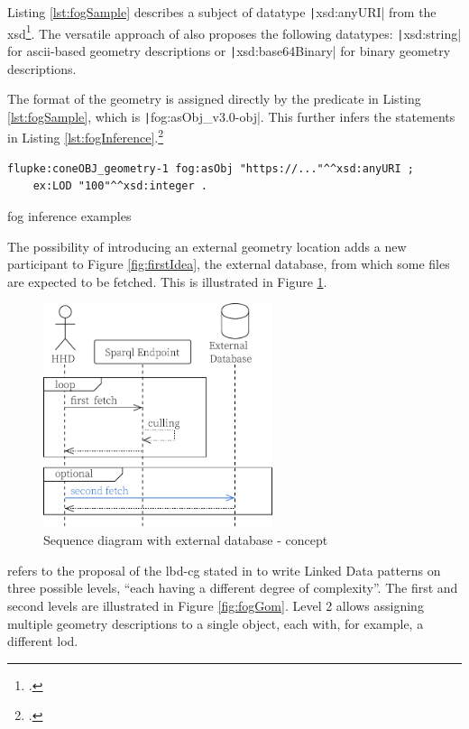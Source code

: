Listing \ref{lst:fogSample} describes a subject of datatype \texttt|xsd:anyURI| from the \ac{xsd}\footcites{xsd}. The versatile approach of \cite{Bonduel2019} also proposes the following datatypes: \texttt|xsd:string| for \ac{ascii}-based geometry descriptions or \texttt|xsd:base64Binary| for binary geometry descriptions.

The format of the geometry is assigned directly by the predicate in Listing \ref{lst:fogSample}, which is \texttt|fog:asObj_v3.0-obj|. This further infers the statements in Listing \ref{lst:fogInference}.\footcite{fog}

\begin{listing}[H]
    \begin{verbatim}
flupke:coneOBJ_geometry-1 fog:asObj "https://..."^^xsd:anyURI ;
    ex:LOD "100"^^xsd:integer .
    \end{verbatim}
    \vspace{-0.7cm}
    \caption{\acs{fog} inference examples}
    \label{lst:fogInference}
\end{listing}

The possibility of introducing an external geometry location adds a new participant to Figure \ref{fig:firstIdea}, the external database, from which some files are expected to be fetched. This is illustrated in Figure \ref{fig:3participants}.

\begin{figure}[H]
    \centering
    \includegraphics[width=0.6\textwidth]{figures/pdf/3participants.pdf}
    \caption{Sequence diagram with external database - concept}
    \label{fig:3participants}
\end{figure}

\cite{Bonduel2019} refers to the proposal of the \ac{lbd-cg} stated in \cite{holten2018opm} to write Linked Data patterns on three possible levels, \enquote{each having a different degree of complexity}. The first and second levels are illustrated in Figure \ref{fig:fogGom}. Level 2 allows assigning multiple geometry descriptions to a single object, each with, for example, a different \ac{lod}.

